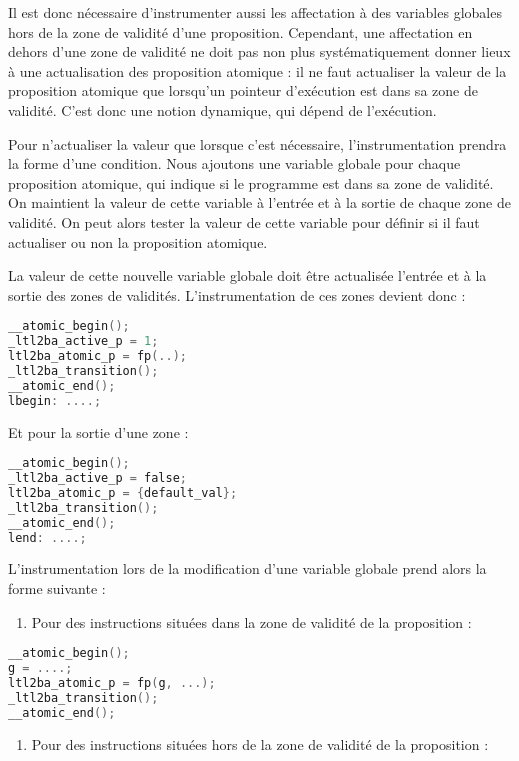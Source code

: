 Il est donc nécessaire d'instrumenter aussi les affectation à des
variables globales hors de la zone de validité d'une proposition.
Cependant, une affectation en dehors d'une zone de validité ne doit pas
non plus systématiquement donner lieux à une actualisation des
proposition atomique : il ne faut actualiser la valeur de la proposition
atomique que lorsqu'un pointeur d'exécution est dans sa zone de
validité. C'est donc une notion dynamique, qui dépend de l'exécution.

Pour n'actualiser la valeur que lorsque c'est nécessaire,
l'instrumentation prendra la forme d'une condition. Nous ajoutons une
variable globale pour chaque proposition atomique, qui indique si le
programme est dans sa zone de validité. On maintient la valeur de cette
variable à l'entrée et à la sortie de chaque zone de validité. On peut
alors tester la valeur de cette variable pour définir si il faut
actualiser ou non la proposition atomique.

La valeur de cette nouvelle variable globale doit être actualisée
l'entrée et à la sortie des zones de validités. L'instrumentation de ces
zones devient donc :

\begin{lstlisting}[language=C]
__atomic_begin();
_ltl2ba_active_p = 1;
ltl2ba_atomic_p = fp(..);
_ltl2ba_transition();
__atomic_end();
lbegin: ....;
\end{lstlisting}

Et pour la sortie d'une zone :

\begin{lstlisting}[language=C]
__atomic_begin();
_ltl2ba_active_p = false;
ltl2ba_atomic_p = {default_val};
_ltl2ba_transition();
__atomic_end();
lend: ....;
\end{lstlisting}

L'instrumentation lors de la modification d'une variable globale prend
alors la forme suivante :

\begin{enumerate}
\def\labelenumi{\arabic{enumi})}
\item
  Pour des instructions situées dans la zone de validité de la
  proposition :
\end{enumerate}

\begin{lstlisting}[language=C]
__atomic_begin();
g = ....;
ltl2ba_atomic_p = fp(g, ...);
_ltl2ba_transition();
__atomic_end();
\end{lstlisting}

\begin{enumerate}
\def\labelenumi{\arabic{enumi})}
\setcounter{enumi}{1}
\item
  Pour des instructions situées hors de la zone de validité de la
  proposition :
\end{enumerate}

